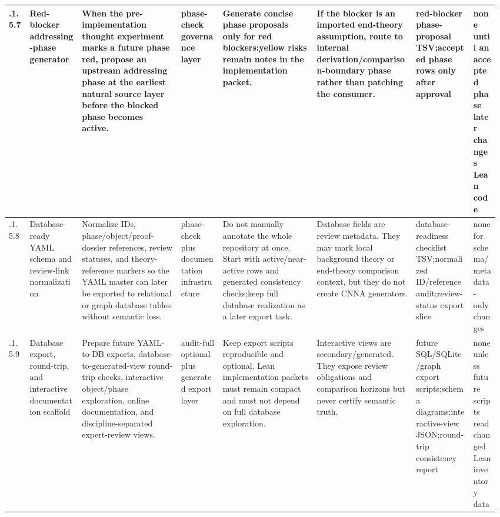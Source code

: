 \begin{longtable}{L{0.042\linewidth} L{0.105\linewidth} L{0.195\linewidth} L{0.08\linewidth} L{0.185\linewidth} L{0.19\linewidth} L{0.118\linewidth} L{0.055\linewidth}}
\hline
{}.1.5.7 & Red-blocker addressing-phase generator & When the pre-implementation thought experiment marks a future phase red, propose an upstream addressing phase at the earliest natural source layer before the blocked phase becomes active. & phase-check governance layer & Generate concise phase proposals only for red blockers;\newline yellow risks remain notes in the implementation packet. & If the blocker is an imported end-theory assumption, route to internal derivation/\allowbreak{}comparison-boundary phase rather than patching the consumer. & red-blocker phase-proposal TSV;\newline accepted phase rows only after approval & none until an accepted phase later changes Lean code\\
\hline
{}.1.5.8 & Database-ready YAML schema and review-link normalization & Normalize IDs, phase/\allowbreak{}object/\allowbreak{}proof-dossier references, review statuses, and theory-reference markers so the YAML master can later be exported to relational or graph database tables without semantic loss. & phase-check plus documentation infrastructure & Do not manually annotate the whole repository at once. Start with active/\allowbreak{}near-active rows and generated consistency checks;\newline keep full database realization as a later export task. & Database fields are review metadata. They may mark local background theory or end-theory comparison context, but they do not create CNNA generators. & database-readiness checklist TSV;\newline normalized ID/\allowbreak{}reference audit;\newline review-status export slice & none for schema/\allowbreak{}metadata-only changes\\
\hline
{}.1.5.9 & Database export, round-trip, and interactive documentation scaffold & Prepare future YAML-to-DB exports, database-to-generated-view round-trip checks, interactive object/\allowbreak{}phase exploration, online documentation, and discipline-separated expert-review views. & audit-full optional plus generated export layer & Keep export scripts reproducible and optional. Lean implementation packets must remain compact and must not depend on full database exploration. & Interactive views are secondary/\allowbreak{}generated. They expose review obligations and comparison horizons but never certify semantic truth. & future SQL/\allowbreak{}SQLite/\allowbreak{}graph export scripts;\newline schema diagrams;\newline interactive-view JSON;\newline round-trip consistency report & none unless future scripts read changed Lean inventory data\\

\end{longtable}

